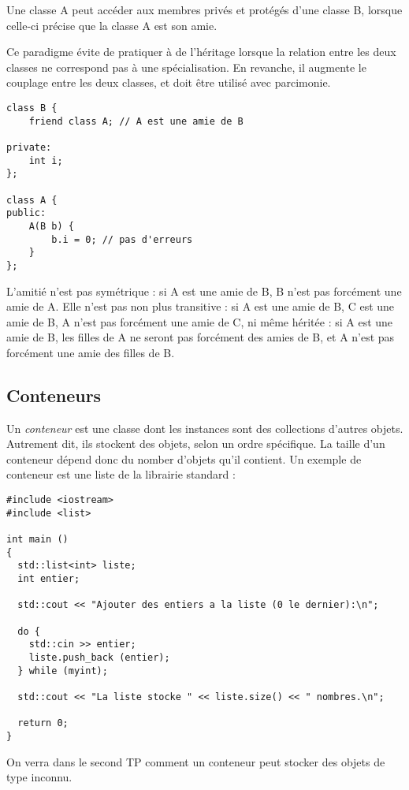 \documentclass[abstracton]{scrartcl}
\begin{document}
Une classe A peut accéder aux membres privés et protégés d'une classe B, lorsque celle-ci précise que la classe A est son amie.

Ce paradigme évite de pratiquer à de l'héritage lorsque la relation entre les deux classes ne correspond pas à une spécialisation. En revanche, il augmente le couplage entre les deux classes, et doit être utilisé avec parcimonie.

\begin{lstlisting}
class B {
    friend class A; // A est une amie de B

private:
    int i;
};

class A {
public:
    A(B b) {
        b.i = 0; // pas d'erreurs
    }
};
\end{lstlisting}

L'amitié n'est pas symétrique : si A est une amie de B, B n'est pas forcément une amie de A. Elle n'est pas non plus transitive : si A est une amie de B, C est une amie de B, A n'est pas forcément une amie de C, ni même héritée : si A est une amie de B, les filles de A ne seront pas forcément des amies de B, et A n'est pas forcément une amie des filles de B.



\subsection{Conteneurs}

Un \emph{conteneur} est une classe dont les instances sont des collections d'autres objets. Autrement dit, ils stockent des objets, selon un ordre spécifique. La taille d'un conteneur dépend donc du nomber d'objets qu'il contient. Un exemple de conteneur est une liste de la librairie standard :

\begin{lstlisting}
#include <iostream>
#include <list>

int main ()
{
  std::list<int> liste;
  int entier;

  std::cout << "Ajouter des entiers a la liste (0 le dernier):\n";

  do {
    std::cin >> entier;
    liste.push_back (entier);
  } while (myint);

  std::cout << "La liste stocke " << liste.size() << " nombres.\n";

  return 0;
}
\end{lstlisting}

On verra dans le second TP comment un conteneur peut stocker des objets de type inconnu.
\end{document}
